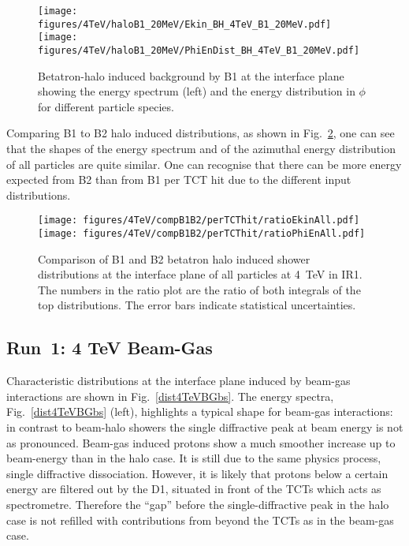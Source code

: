 \begin{figure}%
\begin{center}
\texttt{[image: figures/4TeV/haloB1\_20MeV/Ekin\_BH\_4TeV\_B1\_20MeV.pdf]}
\texttt{[image: figures/4TeV/haloB1\_20MeV/PhiEnDist\_BH\_4TeV\_B1\_20MeV.pdf]}
\end{center}
\vspace{-0.6cm}
 \caption{Betatron-halo induced background by B1 at the interface plane showing the energy spectrum (left) and the energy distribution in $\phi$ for different particle species.
  \label{dist4TeVB1}}
\end{figure}

Comparing B1 to B2 halo induced distributions, as shown in Fig.~\ref{fig:comp4TeVB1B2}, one can see that the shapes of the energy spectrum and of the azimuthal energy distribution of all particles are quite similar. One can recognise that there can be more energy expected from B2 than from B1 per TCT hit due to the different input distributions.



\begin{figure}%
\begin{center}
\texttt{[image: figures/4TeV/compB1B2/perTCThit/ratioEkinAll.pdf]}
\texttt{[image: figures/4TeV/compB1B2/perTCThit/ratioPhiEnAll.pdf]}
\end{center}
\vspace{-0.6cm}
 \caption{Comparison of B1 and B2 betatron halo induced shower distributions at the interface plane of all particles at 4~TeV in IR1. The numbers in the ratio plot are the ratio of both integrals of the top distributions. The error bars indicate statistical uncertainties.
  \label{fig:comp4TeVB1B2}}
\end{figure}


\subsection{Run~1: 4 TeV Beam-Gas}

Characteristic distributions at the interface plane induced by beam-gas interactions are shown in Fig.~\ref{dist4TeVBGbs}. The energy spectra, Fig.~\ref{dist4TeVBGbs} (left), highlights a typical shape for beam-gas interactions: in contrast to beam-halo showers the single diffractive peak at beam energy is not as pronounced. Beam-gas induced protons show a much smoother increase up to beam-energy than in the halo case. It is still due to the same physics process, single diffractive dissociation. However, it is likely that protons below a certain energy are filtered out by the D1, situated in front of the TCTs which acts as spectrometre. Therefore the ``gap'' before the single-diffractive peak in the halo case is not refilled with contributions from beyond the TCTs as in the beam-gas case.

